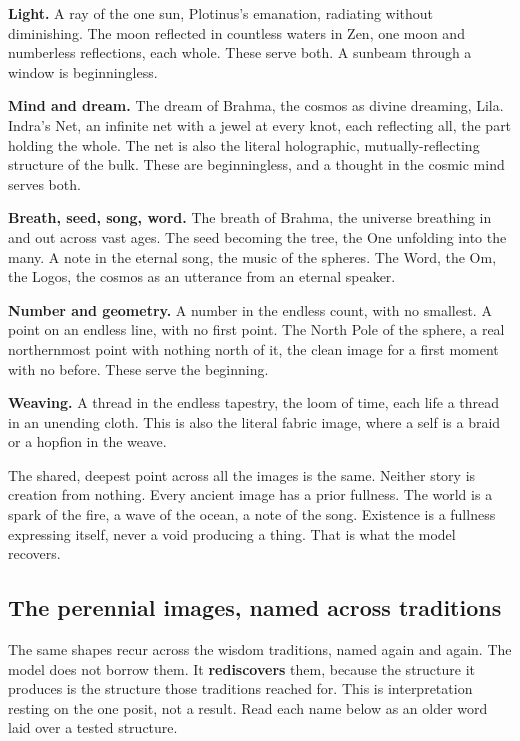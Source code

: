 \textbf{Light.} A ray of the one sun, Plotinus's emanation, radiating without diminishing. The moon reflected in countless waters in Zen, one moon and numberless reflections, each whole. These serve both. A sunbeam through a window is beginningless.

\textbf{Mind and dream.} The dream of Brahma, the cosmos as divine dreaming, Lila. Indra's Net, an infinite net with a jewel at every knot, each reflecting all, the part holding the whole. The net is also the literal holographic, mutually-reflecting structure of the bulk. These are beginningless, and a thought in the cosmic mind serves both.

\textbf{Breath, seed, song, word.} The breath of Brahma, the universe breathing in and out across vast ages. The seed becoming the tree, the One unfolding into the many. A note in the eternal song, the music of the spheres. The Word, the Om, the Logos, the cosmos as an utterance from an eternal speaker.

\textbf{Number and geometry.} A number in the endless count, with no smallest. A point on an endless line, with no first point. The North Pole of the sphere, a real northernmost point with nothing north of it, the clean image for a first moment with no before. These serve the beginning.

\textbf{Weaving.} A thread in the endless tapestry, the loom of time, each life a thread in an unending cloth. This is also the literal fabric image, where a self is a braid or a hopfion in the weave.

\begin{principle}
The shared, deepest point across all the images is the same. Neither story is creation from nothing. Every ancient image has a prior fullness. The world is a spark of the fire, a wave of the ocean, a note of the song. Existence is a fullness expressing itself, never a void producing a thing. That is what the model recovers.
\end{principle}

\subsection{The perennial images, named across traditions}

The same shapes recur across the wisdom traditions, named again and again. The model does not borrow them. It \textbf{rediscovers} them, because the structure it produces is the structure those traditions reached for. This is interpretation resting on the one posit, not a result. Read each name below as an older word laid over a tested structure.

